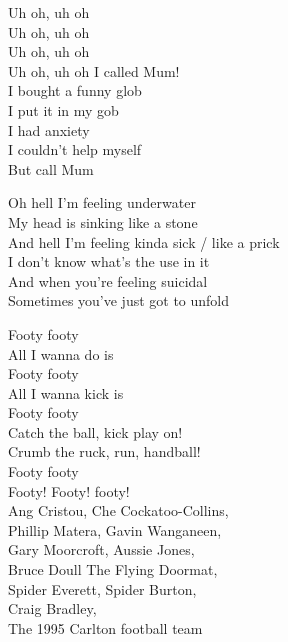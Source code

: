 

Uh oh, uh oh\\
Uh oh, uh oh\\
Uh oh, uh oh\\
Uh oh, uh oh I called Mum!\\

I bought a funny glob\\
I put it in my gob\\
I had anxiety\\
I couldn't help myself\\
But call Mum\\




Oh hell I'm feeling underwater\\
My head is sinking like a stone\\

And hell I'm feeling kinda sick / like a prick\\
I don't know what's the use in it\\

And when you're feeling suicidal\\
Sometimes you've just got to unfold\\




Footy footy\\
All I wanna do is\\
Footy footy\\
All I wanna kick is\\
Footy footy\\
Catch the ball, kick play on!\\
Crumb the ruck, run, handball!\\
Footy footy\\
Footy! Footy! footy!\\

Ang Cristou, Che Cockatoo-Collins,\\
Phillip Matera, Gavin Wanganeen,\\
Gary Moorcroft, Aussie Jones,\\
Bruce Doull The Flying Doormat,\\
Spider Everett, Spider Burton,\\
Craig Bradley,\\
The 1995 Carlton football team\\

